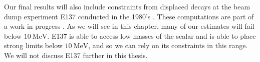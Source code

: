 Our final results will also include constraints from displaced decays at the beam dump experiment E137 conducted in the 1980's \cite{Bjorken:1988as}.
These computations are part of a work in progress \cite{Batell:2015unpub}.
As we will see in this chapter, many of our estimates will fail below $10~\textrm{MeV}$.
E137 is able to access low masses of the scalar and is able to place strong limits below $10~\textrm{MeV}$, and so we can rely on its constraints in this range.
We will not discuss E137 further in this thesis.




